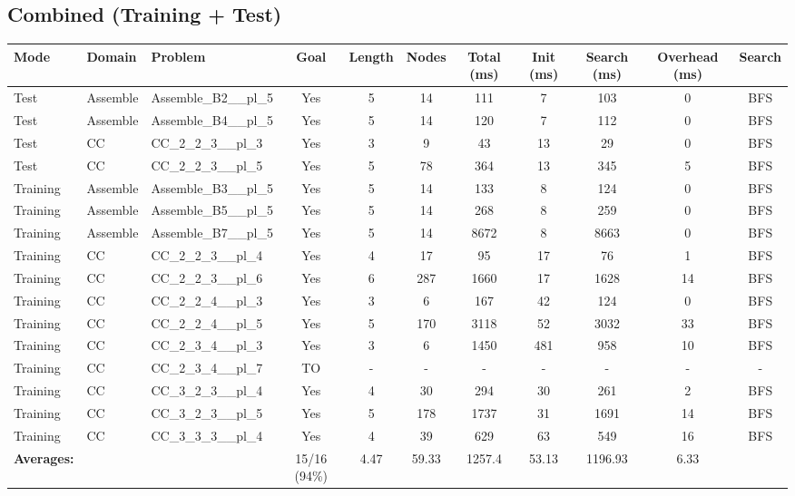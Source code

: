 \documentclass{article}
\begin{document}
\subsection*{Combined (Training + Test)}
\begin{tabular}{lllcccccccc}
\toprule
Mode & Domain & Problem & Goal & Length & Nodes & Total (ms) & Init (ms) & Search (ms) & Overhead (ms) & Search \\
\midrule
Test & Assemble & Assemble\_B2\_\_pl\_5 & Yes & 5 & 14 & 111 & 7 & 103 & 0 & BFS \\
Test & Assemble & Assemble\_B4\_\_pl\_5 & Yes & 5 & 14 & 120 & 7 & 112 & 0 & BFS \\
Test & CC & CC\_2\_2\_3\_\_pl\_3 & Yes & 3 & 9 & 43 & 13 & 29 & 0 & BFS \\
Test & CC & CC\_2\_2\_3\_\_pl\_5 & Yes & 5 & 78 & 364 & 13 & 345 & 5 & BFS \\
Training & Assemble & Assemble\_B3\_\_pl\_5 & Yes & 5 & 14 & 133 & 8 & 124 & 0 & BFS \\
Training & Assemble & Assemble\_B5\_\_pl\_5 & Yes & 5 & 14 & 268 & 8 & 259 & 0 & BFS \\
Training & Assemble & Assemble\_B7\_\_pl\_5 & Yes & 5 & 14 & 8672 & 8 & 8663 & 0 & BFS \\
Training & CC & CC\_2\_2\_3\_\_pl\_4 & Yes & 4 & 17 & 95 & 17 & 76 & 1 & BFS \\
Training & CC & CC\_2\_2\_3\_\_pl\_6 & Yes & 6 & 287 & 1660 & 17 & 1628 & 14 & BFS \\
Training & CC & CC\_2\_2\_4\_\_pl\_3 & Yes & 3 & 6 & 167 & 42 & 124 & 0 & BFS \\
Training & CC & CC\_2\_2\_4\_\_pl\_5 & Yes & 5 & 170 & 3118 & 52 & 3032 & 33 & BFS \\
Training & CC & CC\_2\_3\_4\_\_pl\_3 & Yes & 3 & 6 & 1450 & 481 & 958 & 10 & BFS \\
Training & CC & CC\_2\_3\_4\_\_pl\_7 & TO & - & - & - & - & - & - & - \\
Training & CC & CC\_3\_2\_3\_\_pl\_4 & Yes & 4 & 30 & 294 & 30 & 261 & 2 & BFS \\
Training & CC & CC\_3\_2\_3\_\_pl\_5 & Yes & 5 & 178 & 1737 & 31 & 1691 & 14 & BFS \\
Training & CC & CC\_3\_3\_3\_\_pl\_4 & Yes & 4 & 39 & 629 & 63 & 549 & 16 & BFS \\
\textbf{Averages:} & & & 15/16 (94\%) & 4.47 & 59.33 & 1257.4 & 53.13 & 1196.93 & 6.33 & \\
\bottomrule
\end{tabular}
\newpage
\end{document}
